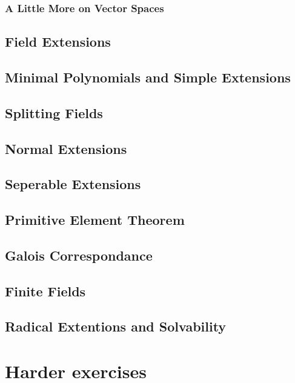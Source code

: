 \documentclass[oneside]{book}
\theoremstyle{lemmastyle}
\theoremstyle{definitionstyle}
\theoremstyle{exercisestyle}
\theoremstyle{claimstyle}
\newcommand{\<}{\langle}
\renewcommand{\>}{\rangle}
\begin{document}
        \section{A Little More on Vector Spaces}
            

    \chapter{Field Extensions}
        

    \chapter{Minimal Polynomials and Simple Extensions}
        

    \chapter{Splitting Fields}
        

    \chapter{Normal Extensions}
        

    \chapter{Seperable Extensions}
        
        
    \chapter{Primitive Element Theorem}
        

    \chapter{Galois Correspondance}
        

    \chapter{Finite Fields}
        

    \chapter{Radical Extentions and Solvability}
        



\part{Harder exercises}

    
\end{document}
